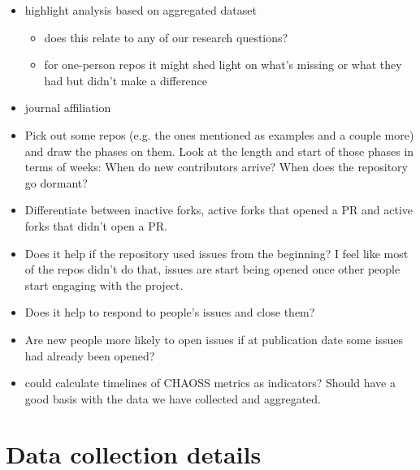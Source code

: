 \documentclass[10pt,a4paper]{scrartcl}
\begin{document}
\begin{itemize}
    \item highlight analysis based on aggregated dataset
    \begin{itemize}
        \item does this relate to any of our research questions?
        \item for one-person repos it might shed light on what's missing or what they had but didn't make a difference
    \end{itemize}
    \item journal affiliation
    \item Pick out some repos (e.g. the ones mentioned as examples and a couple more) and draw the phases on them. Look at the length and start of those phases in terms of weeks: When do new contributors arrive? When does the repository go dormant?
    \item Differentiate between inactive forks, active forks that opened a PR and active forks that didn't open a PR.
    \item Does it help if the repository used issues from the beginning? I feel like most of the repos didn't do that, issues are start being opened once other people start engaging with the project.
    \item Does it help to respond to people's issues and close them?
    \item Are new people more likely to open issues if at publication date some issues had already been opened?
    \item could calculate timelines of CHAOSS metrics as indicators? Should have a good basis with the data we have collected and aggregated.
\end{itemize}

%
%

\appendix

\section{Data collection details}
\end{document}
